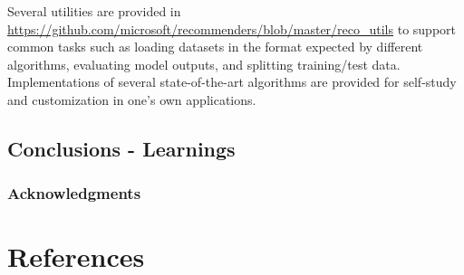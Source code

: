 \documentclass{article}
\begin{document}
Several utilities are provided in \url{https://github.com/microsoft/recommenders/blob/master/reco_utils} to support common tasks such as loading datasets in the format expected by different algorithms, evaluating model outputs, and splitting training/test data. Implementations of several state-of-the-art algorithms are provided for self-study and customization in one's own applications.



 





\subsection{Conclusions - Learnings}



\subsubsection*{Acknowledgments}


\section*{References}
\end{document}
